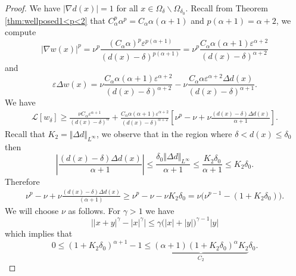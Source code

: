 \documentclass[11pt,reqno]{amsart}
\numberwithin{figure}{section}
\theoremstyle{plain}
\theoremstyle{remark}
\numberwithin{equation}{section}
\begin{document}
\begin{proof}
We have $|\nabla d(x)| = 1$ for all $x\in \Omega_\delta\backslash \Omega_{\delta_0}$. Recall from Theorem \ref{thm:wellposed1<p<2} that $C_\alpha^p \alpha^p = C_\alpha \alpha (\alpha+1)$ and $p(\alpha+1) = \alpha+2$, we compute 
\begin{equation*}
    |\nabla w(x)|^p = \nu^p\frac{(C_\alpha\alpha)^p\varepsilon^{p(\alpha+1)}}{(d(x)-\delta)^{p(\alpha+1)}} = \nu^p\frac{C_\alpha \alpha(\alpha+1)\varepsilon^{\alpha+2}}{(d(x)-\delta)^{\alpha+2}}
\end{equation*}
and
\begin{equation*}
    \varepsilon\Delta w(x) = \nu\frac{C_\alpha\alpha(\alpha+1)\varepsilon^{\alpha+2}}{(d(x)-\delta)^{\alpha+2}} - \nu\frac{C_\alpha\alpha\varepsilon^{\alpha+2}\Delta d(x)}{(d(x)-\delta)^{\alpha+1}}.
\end{equation*}
We have
\begin{equation*}
    \begin{split}
        \mathcal{L}\left[w_\delta\right] \geq \frac{\nu C_\alpha\varepsilon^{\alpha+1}}{(d(x)-\delta)^\alpha} + \frac{C_\alpha \alpha (\alpha+1)\varepsilon^{\alpha+2}}{(d(x)-\delta)^{\alpha+2}}\left[\nu^p-\nu +\nu\frac{(d(x)-\delta)\Delta d(x)}{\alpha+1}\right].
    \end{split}
\end{equation*}
Recall that $K_2= \Vert \Delta d\Vert_{L^\infty}$, we observe that in the region where $\delta< d(x)\leq \delta_0$ then
\begin{equation*}
    \left|\frac{(d(x)-\delta)\Delta d(x)}{\alpha+1}\right| \leq \frac{\delta_0\Vert \Delta d\Vert_{L^\infty}}{\alpha+1} \leq \frac{K_2\delta_0}{\alpha+1}\leq K_2\delta_0.
\end{equation*}
Therefore
\begin{equation}\label{e:choose_nu}
    \begin{split}
        \nu^p-\nu +\nu\frac{(d(x)-\delta)\Delta d(x)}{(\alpha+1)} \geq \nu^p - \nu - \nu K_2\delta_0 = \nu\Big(\nu^{p-1} - (1+K_2\delta_0)\Big).
    \end{split}
\end{equation}
We will choose $\nu$ as follows. For $\gamma>1$ we have
\begin{equation*}
    \Big||x+y|^\gamma - |x|^\gamma\Big|\leq \gamma\Big(|x|+|y|\Big)^{\gamma-1}|y|
\end{equation*}
which implies that
\begin{equation*}
     0 \leq (1+K_2\delta_0)^{\alpha+1} - 1 \leq\underbrace{(\alpha+1)\left(1+K_2\delta_0\right)^\alpha K_2}_{C_2}\delta_0.

\end{equation*}
\end{proof}
\end{document}
